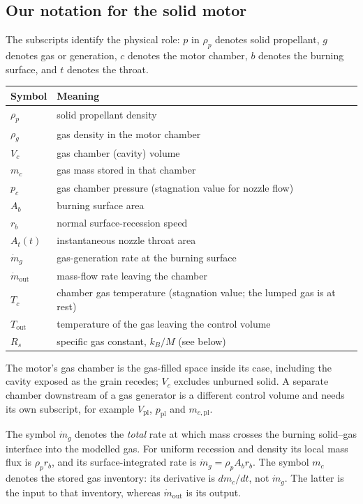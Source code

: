\subsection{Our notation for the solid motor}
\label{sec:sb-notation}
The subscripts identify the physical role: $p$ in $\rho_p$ denotes
solid propellant, $g$ denotes gas or generation, $c$ denotes the motor
chamber, $b$ denotes the burning surface, and $t$ denotes the throat.
\begin{center}
\begin{tabular}{ll}
Symbol & Meaning\\ \hline
$\rho_p$ & solid propellant density\\
$\rho_g$ & gas density in the motor chamber\\
$V_c$ & gas chamber (cavity) volume\\
$m_c$ & gas mass stored in that chamber\\
$p_c$ & gas chamber pressure (stagnation value for nozzle flow)\\
$A_b$ & burning surface area\\
$r_b$ & normal surface-recession speed\\
$A_t(t)$ & instantaneous nozzle throat area\\
$\dot m_g$ & gas-generation rate at the burning surface\\
$\dot m_{\mathrm{out}}$ & mass-flow rate leaving the chamber\\
$T_c$ & chamber gas temperature (stagnation value; the lumped gas is at rest)\\
$T_{\mathrm{out}}$ & temperature of the gas leaving the control volume\\
$R_s$ & specific gas constant, $k_B/M$ (see below)
\end{tabular}
\end{center}
The motor's gas chamber is the gas-filled space inside its case, including
the cavity exposed as the grain recedes; $V_c$ excludes unburned solid.
A separate chamber downstream of a gas generator is a different control
volume and needs its own subscript, for example
$V_{\mathrm{pl}}$, $p_{\mathrm{pl}}$ and $m_{c,\mathrm{pl}}$.

The symbol $\dot m_g$ denotes the \emph{total} rate at which mass crosses
the burning solid--gas interface into the modelled gas. For uniform
recession and density its local mass flux is $\rho_p r_b$, and its
surface-integrated rate is $\dot m_g=\rho_p A_b r_b$.
The symbol $m_c$ denotes the stored gas inventory: its derivative is
$dm_c/dt$, not $\dot m_g$. The latter is the input to that inventory,
whereas $\dot m_{\mathrm{out}}$ is its output.

